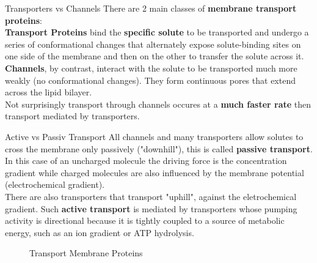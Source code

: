 \documentclass[../main.tex]{subfiles}
\begin{document}
\begin{RemarkWithTitel}{Transporters vs Channels}
	There are 2 main classes of \textbf{membrane transport proteins}:  \\
	\textbf{Transport Proteins} bind the \textbf{specific solute} to be transported and undergo a series of conformational changes that alternately expose solute-binding sites on one side of the membrane and then on the other to transfer the solute across it.\\
	\textbf{Channels}, by contrast, interact with the solute to be transported much more weakly (no conformational changes). They form continuous pores that extend across the lipid bilayer.\\
	Not surprisingly transport through channels occures at a \textbf{much faster rate} then transport mediated by transporters.
\end{RemarkWithTitel}
\begin{RemarkWithTitel}{Active vs Passiv Transport}
	All channels and many transporters allow solutes to cross the membrane only passively ("downhill"), this is called \textbf{passive transport}. In this case of an uncharged molecule the driving force is the concentration gradient while charged molecules are also influenced by the membrane potential (electrochemical gradient). \\
	There are also transporters that transport "uphill", against the eletrochemical gradient. Such \textbf{active transport} is mediated by transporters whose pumping activity is directional because it is tightly coupled to a source of metabolic energy, such as an ion gradient or ATP hydrolysis. 
\end{RemarkWithTitel} 
\begin{figure}[H]
	\centering
	\caption{Transport Membrane Proteins}
\end{figure}
\end{document}
